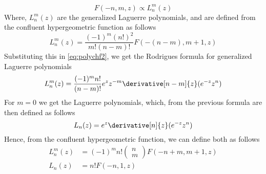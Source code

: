 \documentclass[a4paper, 11pt]{book}
\newcommand{\1}{\opr{\mathds{1}}}
\theoremstyle{plain}
\begin{document}
	\begin{equation*}
		F(-n,m,z)\propto L^m_n(z)
	\end{equation*}
	Where, $L^m_n(z)$ are the generalized Laguerre polynomials, and are defined from the confluent hypergeometric function as follows
	\begin{equation}
		L^m_n(z)=\frac{(-1)^m(n!)^2}{m!(n-m)!}F(-(n-m),m+1,z)
		\label{eq:genlaguerrepol}
	\end{equation}
	Substituting this in \eqref{eq:polychf2}, we get the Rodrigues formula for generalized Laguerre polynomials
	\begin{equation}
		L^m_n(z)=\frac{(-1)^mn!}{(n-m)!}e^zz^{-m}\derivative[n-m]{z}(e^{-z}z^n)
		\label{eq:laguerrerod}
	\end{equation}
	For $m=0$ we get the Laguerre polynomials, which, from the previous formula are then defined as follows
	\begin{equation}
		L_n(z)=e^z\derivative[n]{z}(e^{-z}z^n)
		\label{eq:laguerrepol}
	\end{equation}
	Hence, from the confluent hypergeometric function, we can define both as follows
	\begin{equation}
		\begin{aligned}
			L^m_n(z)&=(-1)^mn!\begin{pmatrix}n\\m\end{pmatrix}F(-n+m,m+1,z)\\
			L_n(z)&=n!F(-n,1,z)
		\end{aligned}
		\label{eq:laguerrebothchf}
	\end{equation}
\end{document}
